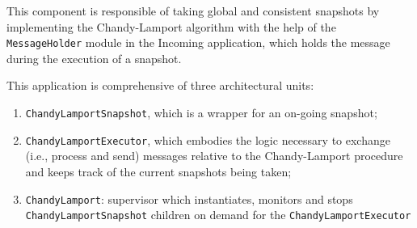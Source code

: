 This component is responsible of taking global and consistent snapshots by
implementing the Chandy-Lamport algorithm with the help of the
\texttt{MessageHolder} module in the Incoming application, which holds the message
during the execution of a snapshot.

This application is comprehensive of three architectural units:

\begin{enumerate}
  \item \texttt{ChandyLamportSnapshot}, which is a wrapper for an on-going
        snapshot;
  \item \texttt{ChandyLamportExecutor}, which embodies the logic necessary to
        exchange (i.e., process and send) messages relative to the
        Chandy-Lamport procedure and keeps track of the current snapshots being
        taken;
  \item \texttt{ChandyLamport}: supervisor which instantiates, monitors and
        stops \texttt{ChandyLamportSnapshot} children on demand for the
        \texttt{ChandyLamportExecutor}
\end{enumerate}
